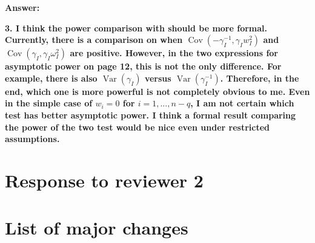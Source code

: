 \documentclass[11pt]{article}
\DeclareMathOperator{\myVar}{Var}
\DeclareMathOperator{\myCov}{Cov}
\theoremstyle{plain}
\theoremstyle{definition}
\theoremstyle{remark}
\begin{document}
\textbf{Answer:}

\textbf{
    3.
    I think the power comparison with \cite{Goeman2006} should be more
    formal. Currently, there is a comparison on when $\myCov(-\gamma_I^{-1}, \gamma_I w_I^2)$ and $\myCov(\gamma_I, \gamma_I \omega_I^2)$ are positive.
    However, in the two expressions for asymptotic power on page 12, this is not the only difference.
    For example, there is also $\myVar (\gamma_I)$ versus $\myVar(\gamma_I^{-1})$.
    Therefore, in the end, which one is more powerful is not completely obvious to me.
    Even in the simple case of $w_i = 0$ for $i = 1, ..., n−q$, I am not certain which test has better asymptotic power.
I think a formal result comparing the power of the two test would be nice
even under restricted assumptions.
}


\section{Response to reviewer 2}





\section{List of major changes}








\end{document}
